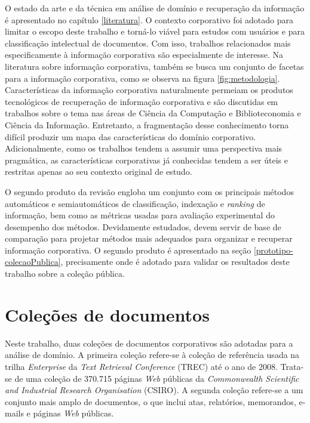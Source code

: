 O estado da arte e da técnica em análise de domínio e recuperação da informação é apresentado no capítulo \ref{literatura}. O contexto corporativo foi adotado para limitar o escopo deste trabalho e torná-lo viável para estudos com usuários e para classificação intelectual de documentos. Com isso, trabalhos relacionados mais especificamente à informação corporativa são especialmente de interesse. Na literatura sobre informação corporativa, também se busca um conjunto de facetas para a informação corporativa, como se observa na figura \ref{fig:metodologia}. Características da informação corporativa naturalmente permeiam os produtos tecnológicos de recuperação de informação corporativa e são discutidas em trabalhos sobre o tema nas áreas de Ciência da Computação e Biblioteconomia e Ciência da Informação. Entretanto, a fragmentação desse conhecimento torna difícil produzir um mapa das características do domínio corporativo. Adicionalmente, como os trabalhos tendem a assumir uma perspectiva mais pragmática, as características corporativas já conhecidas tendem a ser úteis e restritas apenas ao seu contexto original de estudo.

O segundo produto da revisão engloba um conjunto com os principais métodos automáticos e semiautomáticos de classificação, indexação e \textit{ranking} de informação, bem como as métricas usadas para avaliação experimental do desempenho dos métodos. Devidamente estudados, devem servir de base de comparação para projetar métodos mais adequados para organizar e recuperar informação corporativa. O segundo produto é apresentado na seção \ref{prototipo-colecaoPublica}, precisamente onde é adotado para validar os resultados deste trabalho sobre a coleção pública.


\section{Coleções de documentos}

Neste trabalho, duas coleções de documentos corporativos são adotadas para a análise de domínio. A primeira coleção refere-se à coleção de referência usada na trilha \textit{Enterprise} da \textit{Text Retrieval Conference} (TREC) até o ano de 2008. Trata-se de uma coleção de 370.715 páginas \textit{Web} públicas da \textit{Commonwealth Scientific and Industrial Research Organisation} (CSIRO). A segunda coleção refere-se a um conjunto mais amplo de documentos, o que inclui atas, relatórios, memorandos, e-mails e páginas \textit{Web} públicas.

